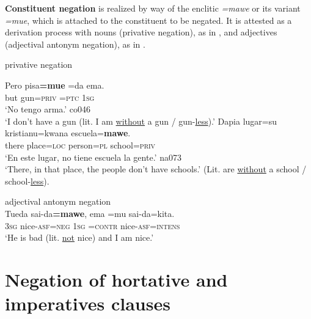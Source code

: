 \documentclass[output=paper]{langsci/langscibook}
\begin{document}
\textbf{Constituent negation} is realized by way of the enclitic
\textit{=mawe} or its variant \textit{=mue}, which is attached to the
constituent to be negated. It is attested as a derivation process with
nouns (privative negation), as in , and adjectives
(adjectival antonym negation), as in .
%
\begin{exe}\ex\label{ex:tacana-privative} privative negation
\begin{xlist}
\ex
\gll Pero pisa\textbf{=mue} =da ema.\\
    but gun=\textsc{priv} \textsc{=ptc} \textsc{1sg}\\
\glt `No tengo arma.' co046\\
`I don't have a gun (lit. I am \underline{without} a gun \slash{}
gun-\underline{less}).'
\ex
\gll Dapia lugar=su kristianu=kwana escuela=\textbf{mawe}.\\
there place=\textsc{loc} person=\textsc{pl} school=\textsc{priv}\\
\glt `En este lugar, no tiene escuela la gente.' na073\\
`There, in that place, the people don't have schools.' (Lit. are
\underline{without} a school \slash{} school-\underline{less}).
\end{xlist}
\ex\label{ex:tacana-antonym} adjectival antonym negation\\
\gll
{}Tueda sai-da\textbf{=mawe},
ema =mu sai-da=kita.\\
3\textsc{sg} nice-\textsc{asf=neg} \textsc{1sg} \textsc{=contr}
nice-\textsc{asf=intens}\\
\glt `He is bad (lit. \underline{not} nice) and I am nice.'\\
\end{exe}

\section{Negation of hortative and imperatives 
clauses}\label{sec:tacana-8}
\end{document}
